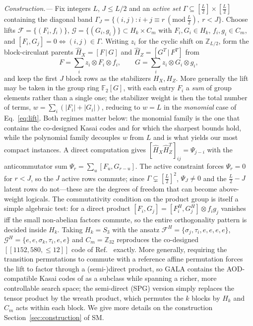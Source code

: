 \documentclass[amsmath,amssymb,twocolumn,aps,prl,superscriptaddress,nofootinbib]{revtex4-2}
\newcommand{\Z}{\mathbb{Z}}
\newcommand{\F}{\mathbb{F}}
\newcommand{\lead}[1]{\textit{#1.---}}
\theoremstyle{definition}
\begin{document}
\lead{Construction} Fix integers $L$, $J\le L/2$ and an \emph{active set} $\Gamma\subseteq[\tfrac L2]\times[\tfrac L2]$ containing the diagonal band $\Gamma_J=\{(i,j):i+j\equiv r \ (\mathrm{mod}\ \tfrac L2),\ r<J\}$. Choose lifts $\mathcal F=\{(F_i,f_i)\}$, $\mathcal G=\{(G_i,g_i)\}\subset H_k\times C_m$ with $F_i,G_i\in H_k$, $f_i,g_i\in C_m$, and $[F_i,G_j]=0\iff(i,j)\in\Gamma$. Writing $z_i$ for the cyclic shift on $\Z_{L/2}$, form the block-circulant parents $\hat H_X=[F\,|\,G]$ and $\hat H_Z=[G^{T}\,|\,F^{T}]$ from
\begin{equation}\label{eq:lift}
F=\sum_{i} z_i\otimes F_i\otimes f_i,\qquad
G=\sum_{i} z_i\otimes G_i\otimes g_i,
\end{equation}
and keep the first $J$ block rows as the stabilizers $H_X,H_Z$. More generally the lift may be taken in the group ring $\F_2[G]$, with each entry $F_i$ a \emph{sum} of group elements rather than a single one; the stabilizer weight is then the total number of terms, $w=\sum_i(|F_i|+|G_i|)$, reducing to $w=L$ in the \emph{monomial} case of Eq.~\eqref{eq:lift}. Both regimes matter below: the monomial family is the one that contains the co-designed Kasai codes and for which the sharpest bounds hold, while the polynomial family decouples $w$ from $L$ and is what yields our most compact instances. A direct computation gives $[\hat H_X\hat H_Z^{T}]_{ij}=\Psi_{j-i}$ with the anticommutator sum $\Psi_r=\sum_{u}[F_u,G_{r-u}]$. The active constraint forces $\Psi_r=0$ for $r<J$, so the $J$ active rows commute; since $\Gamma\subsetneq[\tfrac L2]^2$, $\Psi_J\neq0$ and the $\tfrac L2-J$ latent rows do not---these are the degrees of freedom that can become above-weight logicals. The commutativity condition on the product group is itself a simple algebraic test: for a direct product $[F_i,G_j]=[F^H_i,G^H_j]\otimes f_i g_j$ vanishes iff the small non-abelian factors commute, so the entire orthogonality pattern is decided inside $H_k$. Taking $H_k=S_3$ with the ansatz $\mathcal F^{H}=\{\sigma_j,\tau_i,e,e,e,e\}$, $\mathcal G^{H}=\{e,e,\sigma_k,\tau_i,e,e\}$ and $C_m=\Z_{32}$ reproduces the co-designed $[[1152,580,\le12]]$ code of Ref.~\cite{zhao2026ultrahighratequantumerrorcorrection} exactly. More generally, requiring the transition permutations to commute with a reference affine permutation forces the lift to factor through a (semi-)direct product, so GALA contains the AOD-compatible Kasai codes of \cite{zhao2026ultrahighratequantumerrorcorrection} as a subclass while spanning a richer, more controllable search space; the semi-direct (SPG) version simply replaces the tensor product by the wreath product, which permutes the $k$ blocks by $H_k$ and $C_m$ acts within each block. We give more details on the construction Section~\ref{sec:construction} of SM.
\end{document}
